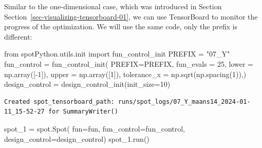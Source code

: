 \documentclass[
  letterpaper,
  DIV=11,
  numbers=noendperiod]{scrreprt}
\newenvironment{Shaded}{\begin{snugshade}}{\end{snugshade}}
\newcommand{\DecValTok}[1]{\textcolor[rgb]{0.68,0.00,0.00}{#1}}
\newcommand{\ImportTok}[1]{\textcolor[rgb]{0.00,0.46,0.62}{#1}}
\newcommand{\NormalTok}[1]{\textcolor[rgb]{0.00,0.23,0.31}{#1}}
\newcommand{\OperatorTok}[1]{\textcolor[rgb]{0.37,0.37,0.37}{#1}}
\newcommand{\StringTok}[1]{\textcolor[rgb]{0.13,0.47,0.30}{#1}}
\begin{document}
\begin{tcolorbox}[enhanced jigsaw, left=2mm, opacitybacktitle=0.6, leftrule=.75mm, toptitle=1mm, opacityback=0, colback=white, rightrule=.15mm, colframe=quarto-callout-note-color-frame, title=\textcolor{quarto-callout-note-color}{\faInfo}\hspace{0.5em}{TensorBoard}, toprule=.15mm, coltitle=black, bottomrule=.15mm, bottomtitle=1mm, colbacktitle=quarto-callout-note-color!10!white, titlerule=0mm, breakable, arc=.35mm]

Similar to the one-dimensional case, which was introduced in Section
Section~\ref{sec-visualizing-tensorboard-01}, we can use TensorBoard to
monitor the progress of the optimization. We will use the same code,
only the prefix is different:

\begin{Shaded}
\begin{Highlighting}[]
\ImportTok{from}\NormalTok{ spotPython.utils.init }\ImportTok{import}\NormalTok{ fun\_control\_init}
\NormalTok{PREFIX }\OperatorTok{=} \StringTok{"07\_Y"}
\NormalTok{fun\_control }\OperatorTok{=}\NormalTok{ fun\_control\_init(}
\NormalTok{    PREFIX}\OperatorTok{=}\NormalTok{PREFIX,}
\NormalTok{    fun\_evals }\OperatorTok{=} \DecValTok{25}\NormalTok{,}
\NormalTok{    lower }\OperatorTok{=}\NormalTok{ np.array([}\OperatorTok{{-}}\DecValTok{1}\NormalTok{]),}
\NormalTok{    upper }\OperatorTok{=}\NormalTok{ np.array([}\DecValTok{1}\NormalTok{]),}
\NormalTok{    tolerance\_x }\OperatorTok{=}\NormalTok{ np.sqrt(np.spacing(}\DecValTok{1}\NormalTok{)),)}
\NormalTok{design\_control }\OperatorTok{=}\NormalTok{ design\_control\_init(init\_size}\OperatorTok{=}\DecValTok{10}\NormalTok{)}
\end{Highlighting}
\end{Shaded}

\begin{verbatim}
Created spot_tensorboard_path: runs/spot_logs/07_Y_maans14_2024-01-11_15-52-27 for SummaryWriter()
\end{verbatim}

\end{tcolorbox}

\begin{Shaded}
\begin{Highlighting}[]
\NormalTok{spot\_1 }\OperatorTok{=}\NormalTok{ spot.Spot(}
\NormalTok{            fun}\OperatorTok{=}\NormalTok{fun,}
\NormalTok{            fun\_control}\OperatorTok{=}\NormalTok{fun\_control,}
\NormalTok{            design\_control}\OperatorTok{=}\NormalTok{design\_control)}
\NormalTok{spot\_1.run()}
\end{Highlighting}
\end{Shaded}
\end{document}
